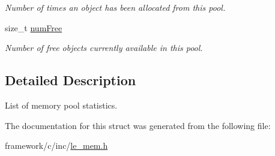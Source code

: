 \begin{DoxyCompactItemize}
\begin{DoxyCompactList}\small\item\em Number of times an object has been allocated from this pool. \end{DoxyCompactList}\item 
\hypertarget{structle__mem___pool_stats__t_adbc69b9f0b2b6719fdb9f40e29688381}{}size\+\_\+t \hyperlink{structle__mem___pool_stats__t_adbc69b9f0b2b6719fdb9f40e29688381}{num\+Free}\label{structle__mem___pool_stats__t_adbc69b9f0b2b6719fdb9f40e29688381}

\begin{DoxyCompactList}\small\item\em Number of free objects currently available in this pool. \end{DoxyCompactList}\end{DoxyCompactItemize}


\subsection{Detailed Description}
List of memory pool statistics. 

The documentation for this struct was generated from the following file\+:\begin{DoxyCompactItemize}
\item 
framework/c/inc/\hyperlink{le__mem_8h}{le\+\_\+mem.\+h}\end{DoxyCompactItemize}
